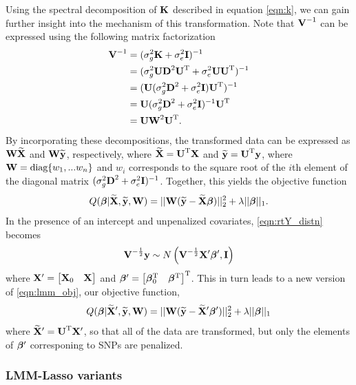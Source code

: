Using the spectral decomposition of $\textbf{K}$ described in equation \eqref{eqn:k}, we can gain further insight into the mechanism of this transformation. Note that $\textbf{V}^{-1}$ can be expressed using the following matrix factorization 
\begin{align*}
    \textbf{V}^{-1} &= (\sigma^2_g \textbf{K} + \sigma^2_e \textbf{I})^{-1}\\
    &=(\sigma^2_g \textbf{U} \textbf{D}^2 \textbf{U}^{\text{T}} + \sigma^2_e \textbf{U} \textbf{U}^{\text{T}})^{-1}\\
    &= (\textbf{U} (\sigma^2_g \textbf{D}^2 + \sigma^2_e \textbf{I}) \textbf{U}^{\text{T}})^{-1}\\
    &=\textbf{U} (\sigma^2_g \textbf{D}^2 + \sigma^2_e \textbf{I})^{-1} \textbf{U}^{\text{T}}\\
    &=\textbf{U} \textbf{W}^2 \textbf{U}^{\text{T}}.
\end{align*}
By incorporating these decompositions, the transformed data can be expressed as $\textbf{W} \widetilde{\textbf{X}{}}$ and $\textbf{W} \widetilde{\textbf{y}}$, respectively, where $\widetilde{\textbf{X}{}} = \textbf{U}^{\text{T}} \textbf{X}$ and $\widetilde{\textbf{y}} = \textbf{U}^{\text{T}} \textbf{y}$, where $\textbf{W} = \text{diag}\{w_1, ... w_n\}$ and $w_i$ corresponds to the square root of the $i$th element of the diagonal matrix $(\sigma^2_g \textbf{D}^2 + \sigma^2_e \textbf{I})^{-1}$. Together, this yields the objective function
\begin{equation}
\label{eqn:lmm_obj}
Q(\boldsymbol{\beta}{} | \widetilde{\textbf{X}{}}, \widetilde{\textbf{y}}, \textbf{W}) = || \textbf{W} (\widetilde{\textbf{y}} - \widetilde{\textbf{X}{}} \boldsymbol{\beta}{})||_2^2 + \lambda || \boldsymbol{\beta}{} ||_1.
\end{equation}
In the presence of an intercept and unpenalized covariates, \eqref{eqn:rtY_distn} becomes 
\begin{equation}
\textbf{V}^{-\frac{1}{2}}\textbf{y} \sim N\left(\textbf{V}^{-\frac{1}{2}} \textbf{X}{^\prime} \boldsymbol{\beta}{}{^\prime}, \textbf{I} \right)
\end{equation}
where $\textbf{X}{^\prime} = \begin{bmatrix} \textbf{X}_0 & \textbf{X} \end{bmatrix}$ and $\boldsymbol{\beta}{}{^\prime} = \begin{bmatrix} \boldsymbol{\beta}{}_0^{\text{T}} & \boldsymbol{\beta}{}^{\text{T}} \end{bmatrix}^{\text{T}}$. This in turn leads to a new version of \eqref{eqn:lmm_obj}, our objective function,  
\begin{equation}
Q(\boldsymbol{\beta}{} | \widetilde{\textbf{X}{}}{^\prime}, \widetilde{\textbf{y}}, \textbf{W}) = || \textbf{W} (\widetilde{\textbf{y}} - \widetilde{\textbf{X}{}}{^\prime} \boldsymbol{\beta}{}{^\prime})||_2^2 + \lambda || \boldsymbol{\beta}{} ||_1
\end{equation}
where $\widetilde{\textbf{X}{}}{^\prime} = \textbf{U}^{\text{T}} \textbf{X}{^\prime}$, so that all of the data are transformed, but only the elements of $\boldsymbol{\beta}{}{^\prime}$ corresponing to SNPs are penalized. 

\subsubsection{LMM-Lasso variants}
\label{sec:rak-ggmix}

